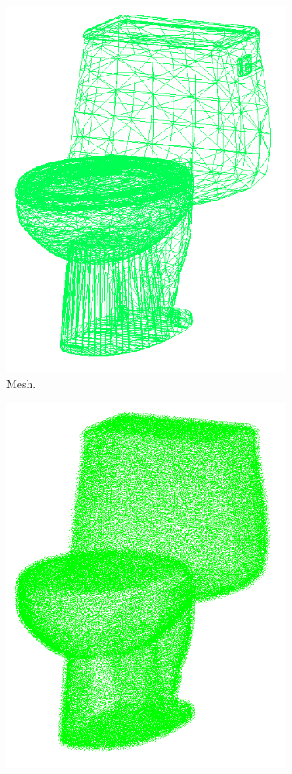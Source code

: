 \begin{figure}[!htb]
\begin{subfigure}{0.32\linewidth}
    \includegraphics[width=0.9\linewidth]{Figures/ObjRecog/toilet_off.png}
    \caption{Mesh.}
    \label{fig:objrecog:dataproc:mesh}
  \end{subfigure}
  \begin{subfigure}{0.32\linewidth}
    \includegraphics[width=0.9\linewidth]{Figures/ObjRecog/toilet_cloud.png}

\end{subfigure}
\end{figure}
